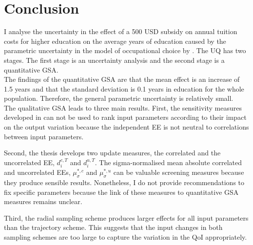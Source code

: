 \section{Conclusion}
\thispagestyle{plain}  %

\noindent
I analyse the uncertainty in the effect of a 500 USD subsidy on annual tuition costs for higher education on the average years of education caused by the parametric uncertainty in the model of occupational choice by \cite{Keane.1994}. The UQ has two stages. The first stage is an uncertainty analysis and the second stage is a quantitative GSA.\\

\noindent
The findings of the quantitative GSA are that the mean effect is an increase of 1.5 years and that the standard deviation is 0.1 years in education for the whole population. Therefore, the general parametric uncertainty is relatively small.\\

\noindent
The qualitative GSA leads to three main results.
First, the sensitivity measures developed in \cite{ge2017extending} can not be used to rank input parameters according to their impact on the output variation because the independent EE is not neutral to correlations between input parameters.

Second, the thesis develops two update measures, the correlated and the uncorrelated EE, $d_i^{c, T}$ and $d_i^{u, T}$. The sigma-normalised mean absolute correlated and uncorrelated EEs, $\mu^{*,c}_{\sigma}$ and $\mu^{*,u}_{\sigma}$ can be valuable screening measures because they produce sensible results. Nonetheless, I do not provide recommendations to fix specific parameters because the link of these measures to quantitative GSA measures remains unclear.


Third, the radial sampling scheme produces larger effects for all input parameters than the trajectory scheme. This suggests that the input changes in both sampling schemes are too large to capture the variation in the QoI appropriately.